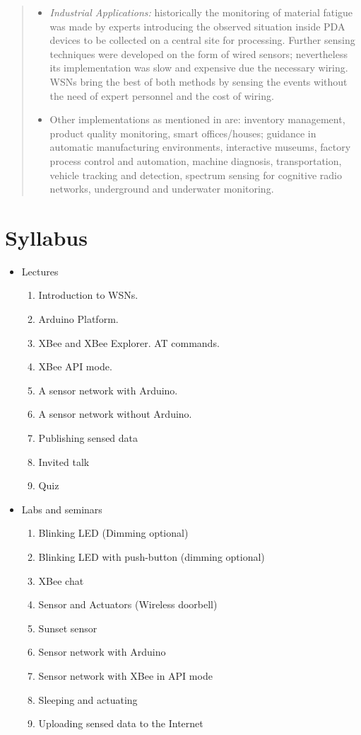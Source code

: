 \begin{quotation}
\begin{itemize}
    \item \emph{Industrial Applications:} historically the monitoring of material fatigue was made by experts introducing the observed situation inside PDA devices to be collected on a central site for processing. Further sensing techniques were developed on the form of wired sensors; nevertheless its implementation was slow and expensive due the necessary wiring. WSNs bring the best of both methods by sensing the events without the need of expert personnel and the cost of wiring. \\
    \item Other implementations as mentioned in \cite{akyildiz2010wireless} are: inventory management, product quality monitoring, smart offices/houses; guidance in automatic manufacturing environments, interactive museums, factory process control and automation, machine diagnosis, transportation, vehicle tracking and detection, spectrum sensing for cognitive radio networks, underground and underwater monitoring. \\
\end{itemize}

\end{quotation}

\section{Syllabus}
\begin{itemize}
  \item Lectures
  \begin{enumerate}
    \item Introduction to WSNs.
    \item Arduino Platform.
    \item XBee and XBee Explorer. AT commands.
    \item XBee API mode.
    \item A sensor network with Arduino.
    \item A sensor network without Arduino.
    \item Publishing sensed data
    \item Invited talk
    \item Quiz
  \end{enumerate}
  \item Labs and seminars
  \begin{enumerate}
    \item Blinking LED (Dimming optional)
    \item Blinking LED with push-button (dimming optional)
    \item XBee chat
    \item Sensor and Actuators (Wireless doorbell)
    \item Sunset sensor
    \item Sensor network with Arduino
    \item Sensor network with XBee in API mode
    \item Sleeping and actuating
    \item Uploading sensed data to the Internet
  \end{enumerate}
\end{itemize}

